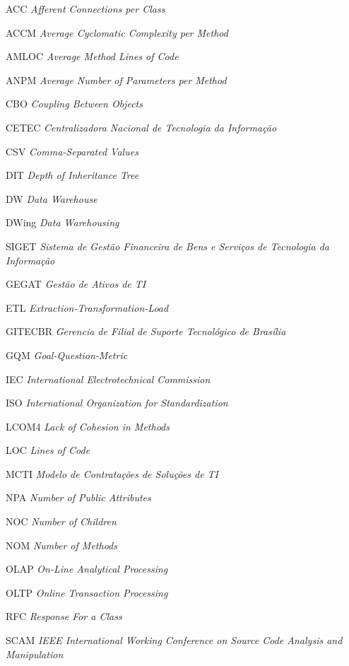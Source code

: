 \begin{siglas}
\item [ACC]   \textit{Afferent Connections per Class}
\item [ACCM]  \textit{Average Cyclomatic Complexity per Method}
\item [AMLOC] \textit{Average Method Lines of Code}
\item [ANPM]  \textit{Average Number of Parameters per Method}
\item [CBO]   \textit{Coupling Between Objects}
\item [CETEC]   \textit{Centralizadora Nacional de Tecnologia da Informação}
\item [CSV]   \textit{Comma-Separated Values}
\item [DIT]	  \textit{Depth of Inheritance Tree}
\item [DW]	  \textit{Data Warehouse}
\item [DWing]	  \textit{Data Warehousing}
\item [SIGET]	  \textit{Sistema de Gestão Financeira de Bens e Serviços de Tecnologia da Informação}
\item [GEGAT]   \textit{Gestão de Ativos de TI}
\item [ETL]   \textit{Extraction-Transformation-Load}
\item [GITECBR]   \textit{Gerencia de Filial de Suporte Tecnológico de Brasília}
\item [GQM]   \textit{Goal-Question-Metric}
\item [IEC]   \textit{International Electrotechnical Commission}
\item [ISO]   \textit{International Organization for Standardization}
\item [LCOM4] \textit{Lack of Cohesion in Methods}
\item [LOC]   \textit{Lines of Code}
\item [MCTI]   \textit{Modelo de Contratações de Soluções de TI}
\item [NPA]   \textit{Number of Public Attributes}
\item [NOC]   \textit{Number of Children}
\item [NOM]   \textit{Number of Methods}
\item [OLAP]  \textit{On-Line Analytical Processing}
\item [OLTP]  \textit{Online Transaction Processing}
\item [RFC]   \textit{Response For a Class}
\item [SCAM]  \textit{IEEE International Working Conference on Source Code Analysis and Manipulation}

\end{siglas}
